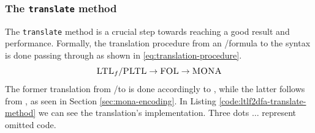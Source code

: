 \subsubsection{The \texttt{translate} method}
The \texttt{translate} method is a crucial step towards reaching a good result and performance. Formally, the translation procedure from an \LTLf/\PLTL formula to the \MONA syntax is done passing through \FOL as shown in \ref{eq:translation-procedure}.
\begin{equation}\label{eq:translation-procedure}
\textsc{LTL}_f/\textsc{PLTL} \rightarrow \textsc{FOL} \rightarrow \textsc{MONA}
\end{equation}
The former translation from \LTLf/\PLTL to \FOL is done accordingly to \citep{de2013linear}, while the latter follows from \citep{monamanual2001}, as seen in Section \ref{sec:mona-encoding}.
In Listing \ref{code:ltlf2dfa-translate-method} we can see the translation's implementation. Three dots $\dots$ represent omitted code.
